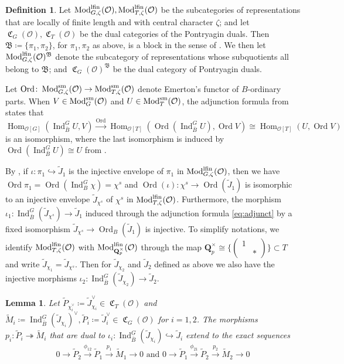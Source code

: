 \documentclass[leqno]{amsart}
\newtheorem{lem}[thm]{Lemma}
\theoremstyle{definition}
\newtheorem{defn}[thm]{Definition}
\theoremstyle{remark}
\newcommand{\smat}[1]{\left(\begin{smallmatrix} #1 \end{smallmatrix}\right)}
\newcommand{\oo}{\mathcal{O}}
\newcommand{\Qp}{\mathbf{Q}_p}
\DeclareMathOperator{\Hom}{Hom}
\DeclareMathOperator{\Ind}{Ind}
\DeclareMathOperator{\Mod}{\textnormal{Mod}}
\DeclareMathOperator{\fC}{\mathfrak{C}} %
\DeclareMathOperator{\Ord}{Ord} %
\newcommand{\B}{\mathfrak B} %
\newcommand{\sm}{\textnormal{sm}}
\newcommand{\lfin}{\textnormal{lfin}}
\begin{document}
\begin{defn}\label{def:block}
Let $\Mod^{\lfin}_{G,\zeta}(\oo), \Mod^{\lfin}_{T,\zeta}(\oo)$
be the subcategories
of representations that are 
locally of finite length 
and with central character $\zeta$;
and let $\fC_G(\oo), \fC_T(\oo)$
be the dual categories
of the Pontryagin duals.
Then $\B\coloneqq\{\pi_1,\pi_2\}$,
for $\pi_1,\pi_2$ as above, is a block 
in the sense of \cite[\S 5]{pask}.
We then let $\Mod^{\lfin}_{G,\zeta}(\oo)^\B$
denote the subcategory
of representations whose subquotients
all belong to $\B$;
and $\fC_G(\oo)^\B$
be the dual category of Pontryagin duals.
\end{defn}

Let $\Ord\colon \Mod_{G,\zeta}^{\sm}(\oo)
\to \Mod_{T,\zeta}^{\sm}(\oo)$
denote Emerton's functor of $B$-ordinary parts.
When $V\in \Mod^{\sm}_G(\oo)$ and
$U\in \Mod^{\sm}_T(\oo)$,
the adjunction formula
from \cite[Thm 4.4.6]{emeI} states that
\begin{equation}\label{eq:adjunct}
	\Hom_{\oo[G]}(\Ind_{\bar{B}}^GU,V)
	\xrightarrow{\Ord}
	\Hom_{\oo[T]}(\Ord(\Ind_{\bar{B}}^GU),\Ord V)
	\cong
	\Hom_{\oo[T]}(U,\Ord V)
\end{equation}
is an isomorphism, where the last isomorphism
is induced by $\Ord(\Ind_{\bar{B}}^GU)\cong U$
from  \cite[Prop 4.3.4]{emeI}.

By \cite[Prop 7.1]{pask},
if $\iota\colon \pi_1\hookrightarrow \tilde{J}_1$
is the injective envelope of $\pi_1$
in $\Mod^{\lfin}_{G,\zeta}(\oo)$,
then we have $\Ord\pi_1=\Ord(\Ind_B^G\chi)=\chi^s$
and $\Ord(\iota)\colon \chi^s \to \Ord(\tilde{J}_1)$
is isomorphic to an injective envelope
$\tilde{J}_{\chi^s}$ of $\chi^s$
in $\Mod^{\lfin}_{T,\zeta}(\oo)$.
Furthermore, the morphism 
$\iota_1\colon \Ind_{\bar{B}}^G(\tilde{J}_{\chi^s})\to
\tilde{J}_1$
induced through the adjunction formula \eqref{eq:adjunct}
by a fixed isomorphism
$\tilde{J}_{\chi^s}\to \Ord_B(\tilde{J}_1)$
is injective.
To simplify notations,
we identify $\Mod^{\lfin}_{T,\zeta}(\oo)$
with $\Mod^{\lfin}_{\Qp^\times}(\oo)$ through 
the map $\Qp^\times\cong \{\smat{1&\\&*}\}\subset T$
and write $\tilde{J}_{\chi_1}=\tilde{J}_{\chi^s}$.
Then for $ \tilde{J}_{\chi_2}$
and $ \tilde{J}_2$ defined as above
we also have the injective morphisms
$\iota_2\colon \Ind_{\bar{B}}^G(\tilde{J}_{\chi_2})\to
\tilde{J}_2$.


\begin{lem}\cite[Cor 7.7]{pask}
\label{lem:proj_enve}
Let $\tilde{P}_{\chi_i^\vee}\coloneqq \tilde{J}_{\chi_i}^\vee
\in\fC_T(\oo)$ and
$\tilde{M}_i\coloneqq 
\Ind_{\bar{B}}^G(\tilde{J}_{\chi_i})^\vee,
\tilde{P}_i\coloneqq \tilde{J}_i^\vee\in\fC_G(\oo)$
for $i=1,2$.
The morphisms
$p_i\colon \tilde{P}_i\twoheadrightarrow \tilde{M}_i$
that are dual to
$\iota_i\colon 
\Ind_{\bar{B}}^G(\tilde{J}_{\chi_i})\hookrightarrow 
\tilde{J}_i$ 
extend to the exact sequences
\begin{equation}\label{eq:exact_PPM}
	0\to \tilde{P}_{2}\xrightarrow{\phi_{12}} 
	\tilde{P}_{1}\xrightarrow{p_1} \tilde{M}_1\to 0 
	\text{ and }
	0\to \tilde{P}_{1}\xrightarrow{\phi_{21}} 
	\tilde{P}_{2}\xrightarrow{p_2} \tilde{M}_2\to 0
\end{equation}
\end{lem}
\end{document}
